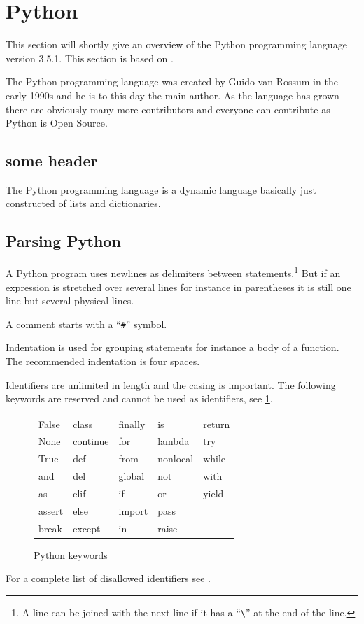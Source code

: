 \section{Python}\label{python}
This section will shortly give an overview of the Python programming language version 3.5.1.
This section is based on \citet{python_docs}.

The Python programming language was created by Guido van Rossum in the early 1990s and he is to this day the main author.
As the language has grown there are obviously many more contributors and everyone can contribute as Python is Open Source.

\subsection{some header}
The Python programming language is a dynamic language basically just constructed of lists and dictionaries.

\subsection{Parsing Python}
A Python program uses newlines as delimiters between statements.\footnote{A line can be joined with the next line if it has a ``\texttt{\textbackslash}'' at the end of the line.}
But if an expression is stretched over several lines for instance in parentheses it is still one line but several physical lines.

A comment starts with a ``\texttt{\#}'' symbol.

Indentation is used for grouping statements for instance a body of a function.
The recommended indentation is four spaces.



Identifiers are unlimited in length and the casing is important.
The following keywords are reserved and cannot be used as identifiers, see \cref{python:keywords_tabular}.
\begin{figure}
  \centering
  \begin{tabular}{l l l l l}
    False & class & finally & is & return \\
None   &    continue &  for     &   lambda  &   try \\
True   &    def     &   from     &  nonlocal &  while \\
and    &    del     &   global   &  not      &  with \\
as     &    elif    &   if        & or       &  yield \\
assert  &   else    &   import   &  pass \\
break   &   except  &   in      &   raise \\
  \end{tabular}
  \caption{Python keywords}
  \label{python:keywords_tabular}
\end{figure}
For a complete list of disallowed identifiers see \citet{python_docs}.

